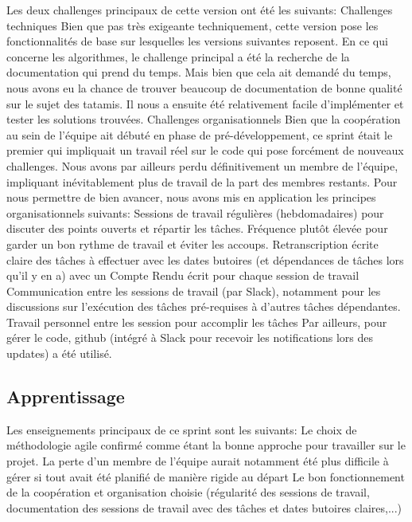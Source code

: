 Les deux challenges principaux de cette version ont été les suivants:
Challenges techniques
Bien que pas très exigeante techniquement, cette version pose les fonctionnalités de base sur lesquelles 
les versions suivantes reposent. En ce qui concerne les algorithmes, le challenge principal a été la recherche 
de la documentation qui prend du temps. Mais bien que cela ait demandé du temps, nous avons eu la chance de 
trouver beaucoup de documentation de bonne qualité sur le sujet des tatamis. Il nous a ensuite été relativement 
facile d'implémenter et tester les solutions trouvées.
Challenges organisationnels
Bien que la coopération au sein de l'équipe ait débuté en phase de pré-développement, ce sprint était le premier 
qui impliquait un travail réel sur le code qui pose forcément de nouveaux challenges. Nous avons par ailleurs perdu 
définitivement un membre de l'équipe, impliquant inévitablement plus de travail de la part des membres restants. 
Pour nous permettre de bien avancer, nous avons mis en application les principes organisationnels suivants:
Sessions de travail régulières (hebdomadaires) pour discuter des points ouverts et répartir les tâches. 
Fréquence plutôt élevée pour garder un bon rythme de travail et éviter les accoups.
Retranscription écrite claire des tâches à effectuer avec les dates butoires (et dépendances de tâches lors qu’il y en a) 
avec un Compte Rendu écrit pour chaque session de travail
Communication entre les sessions de travail (par Slack), notamment pour les discussions sur l'exécution des tâches 
pré-requises à d'autres tâches dépendantes.
Travail personnel entre les session pour accomplir les tâches
Par ailleurs, pour gérer le code, github (intégré à Slack pour recevoir les notifications lors des updates) a été utilisé. 

\subsection{Apprentissage}

Les enseignements principaux de ce sprint sont les suivants:
Le choix de méthodologie agile confirmé comme étant la bonne approche pour travailler sur le projet. 
La perte d’un membre de l'équipe aurait notamment été plus difficile à gérer si tout avait été planifié de manière rigide au départ
Le bon fonctionnement de la coopération et organisation choisie (régularité des sessions de travail, documentation des sessions 
de travail avec des tâches et dates butoires claires,...)
